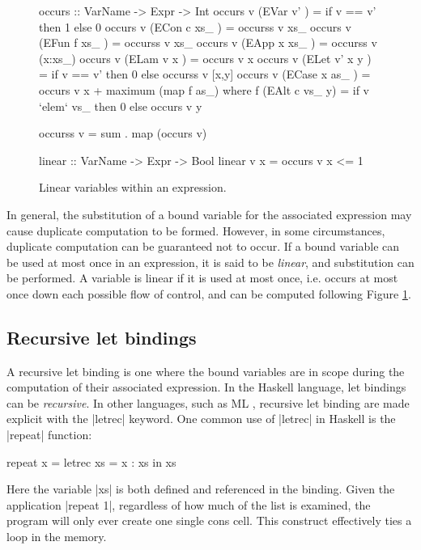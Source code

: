 \begin{figure}
\begin{code}
occurs :: VarName -> Expr -> Int
occurs v (EVar v'      ) = if v == v' then 1 else 0
occurs v (ECon c xs_   ) = occurss v xs_
occurs v (EFun f xs_   ) = occurss v xs_
occurs v (EApp x xs_   ) = occurss v (x:xs_)
occurs v (ELam v x     ) = occurs v x
occurs v (ELet v' x y  ) = if v == v' then 0 else occurss v [x,y]
occurs v (ECase x as_  ) = occurs v x + maximum (map f as_)
    where f (EAlt c vs_ y) = if v `elem` vs_ then 0 else occurs v y

occurss v = sum . map (occurs v)

linear :: VarName -> Expr -> Bool
linear v x = occurs v x <= 1
\end{code}
\caption{Linear variables within an expression.}
\label{figB:linear}
\end{figure}

In general, the substitution of a bound variable for the associated expression may cause duplicate computation to be formed. However, in some circumstances, duplicate computation can be guaranteed not to occur. If a bound variable can be used at most once in an expression, it is said to be \textit{linear}, and substitution can be performed. A variable is linear if it is used at most once, i.e. occurs at most once down each possible flow of control, and can be computed following Figure \ref{figB:linear}.

\subsection{Recursive let bindings}

A recursive let binding is one where the bound variables are in scope during the computation of their associated expression. In the Haskell language, let bindings can be \textit{recursive}. In other languages, such as ML \cite{ml}, recursive let binding are made explicit with the |letrec| keyword. One common use of |letrec| in Haskell is the |repeat| function:

\begin{example}
\label{exB:repeat}
\begin{code}
repeat x =  letrec xs = x : xs
            in xs
\end{code}

Here the variable |xs| is both defined and referenced in the binding. Given the application |repeat 1|, regardless of how much of the list is examined, the program will only ever create one single cons cell. This construct effectively ties a loop in the memory.
\end{example}

